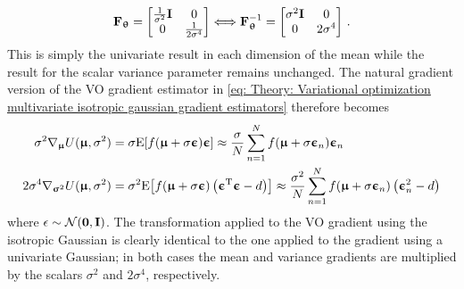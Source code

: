 \begin{equation}
    \F_\thetab = \bmat{\frac{1}{\sigma^2}\I & 0 \\ 0 & \frac{1}{2\sigma^4}} \Longleftrightarrow \F_\thetab^{-1} = \bmat{\sigma^2\I & 0 \\ 0 & 2\sigma^4} \ .
\end{equation}
This is simply the univariate result in each dimension of the mean while the result for the scalar variance parameter remains unchanged.
The natural gradient version of the \gls{VO} gradient estimator in \eqref{eq: Theory: Variational optimization multivariate isotropic gaussian gradient estimators} therefore becomes
\begin{equation}
    \begin{aligned}
        \sigma^2\nabla_{\boldsymbol{\upmu}} U({\boldsymbol{\upmu}},\sigma^2) &= \sigma\text{E}{\left[f({\boldsymbol{\upmu}}+ \sigma{\boldsymbol{\upepsilon}}){\boldsymbol{\upepsilon}}\right]} \approx \frac{\sigma}{N}\sum_{n=1}^N f({\boldsymbol{\upmu}}+\sigma{\boldsymbol{\upepsilon}}_n){\boldsymbol{\upepsilon}}_n\\
        2\sigma^4\nabla_{{\boldsymbol{\upsigma}}^2} U({\boldsymbol{\upmu}},\sigma^2) &= \sigma^2\text{E}{\left[f({\boldsymbol{\upmu}}+ \sigma{\boldsymbol{\upepsilon}})\left({\boldsymbol{\upepsilon}}{^\mathrm{T}}{\boldsymbol{\upepsilon}}-d\right)\right]} \approx \frac{\sigma^2}{N}\sum_{n=1}^N f({\boldsymbol{\upmu}} + \sigma{\boldsymbol{\upepsilon}}_n)\left({\boldsymbol{\upepsilon}}_n^2-d\right)\\
    \end{aligned}\label{eq: Theory: Variational optimization multivariate isotropic gaussian gradient estimators (natural gradient)}
\end{equation}
where $\epsilon\sim\mathcal{N}({\mathbf{0}},{\mathbf{I}})$. The transformation applied to the \gls{VO} gradient using the isotropic Gaussian is clearly identical to the one applied to the gradient using a univariate Gaussian; in both cases the mean and variance gradients are multiplied by the scalars $\sigma^2$  and $2\sigma^4$, respectively.



